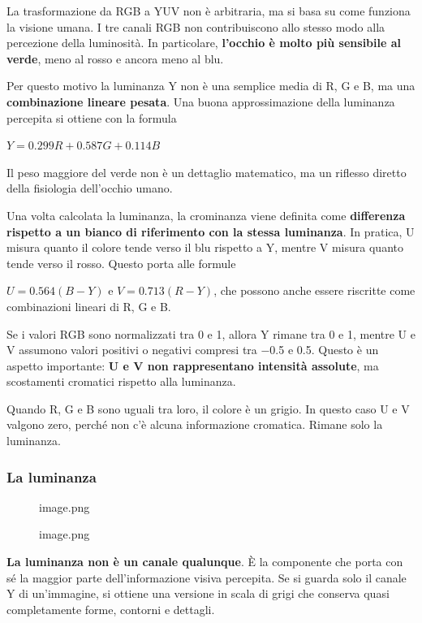 \documentclass[
]{article}
\begin{document}
La trasformazione da RGB a YUV non è arbitraria, ma si basa su come funziona la visione umana. I tre canali RGB non contribuiscono allo stesso modo alla percezione della luminosità. In particolare, \textbf{l'occhio è molto più sensibile al verde}, meno al rosso e ancora meno al blu.

Per questo motivo la luminanza Y non è una semplice media di R, G e B, ma una \textbf{combinazione lineare pesata}. Una buona approssimazione della luminanza percepita si ottiene con la formula

\textbf{\(Y = 0.299 R + 0.587 G + 0.114 B\)}

Il peso maggiore del verde non è un dettaglio matematico, ma un riflesso diretto della fisiologia dell'occhio umano.

Una volta calcolata la luminanza, la crominanza viene definita come \textbf{differenza rispetto a un bianco di riferimento con la stessa luminanza}. In pratica, U misura quanto il colore tende verso il blu rispetto a Y, mentre V misura quanto tende verso il rosso. Questo porta alle formule

\textbf{\(U = 0.564 (B − Y)\)} e \textbf{\(V = 0.713 (R − Y)\)}, che possono anche essere riscritte come combinazioni lineari di R, G e B.

Se i valori RGB sono normalizzati tra 0 e 1, allora Y rimane tra 0 e 1, mentre U e V assumono valori positivi o negativi compresi tra −0.5 e 0.5. Questo è un aspetto importante: \textbf{U e V non rappresentano intensità assolute}, ma scostamenti cromatici rispetto alla luminanza.

Quando R, G e B sono uguali tra loro, il colore è un grigio. In questo caso U e V valgono zero, perché non c'è alcuna informazione cromatica. Rimane solo la luminanza.

\hypertarget{la-luminanza}{%
\subsubsection{La luminanza}\label{la-luminanza}}

\begin{figure}
\centering
{image.png}
\caption{image.png}
\end{figure}

\textbf{La luminanza non è un canale qualunque}. È la componente che porta con sé la maggior parte dell'informazione visiva percepita. Se si guarda solo il canale Y di un'immagine, si ottiene una versione in scala di grigi che conserva quasi completamente forme, contorni e dettagli.
\end{document}
